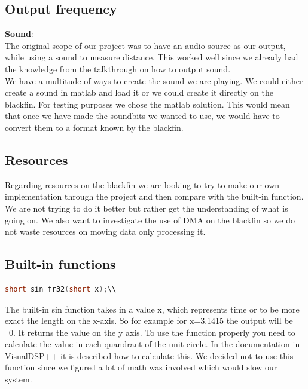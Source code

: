 \subsection{Output frequency}
\textbf{Sound}:\\
The original scope of our project was to have an audio source as our output, while using a sound to measure distance. This worked well since we already had the knowledge from the talkthrough on how to output sound.\\
We have a multitude of ways to create the sound we are playing. We could either create a sound in matlab and load it or we could create it directly on the blackfin. For testing purposes we chose the matlab solution. This would mean that once we have made the soundbits we wanted to use, we would have to convert them to a format known by the blackfin.





\subsection{Resources}
Regarding resources on the blackfin we are looking to try to make our own implementation through the project and then compare with the built-in function. We are not trying to do it better but rather get the understanding of what is going on.
We also want to investigate the use of DMA on the blackfin so we do not waste resources on moving data only processing it.



\subsection{Built-in functions}
\begin{lstlisting}[language=C]
short sin_fr32(short x);\\
\end{lstlisting}
The built-in sin function takes in a value x, which represents time or to be more exact the length on the x-axis. So for example for x=3.1415 the output will be ~0. It returns the value on the y axis. To use the function properly you need to calculate the value in each quandrant of the unit circle. In the documentation in VisualDSP++ it is described how to calculate this. We decided not to use this function since we figured a lot of math was involved which would slow our system.


